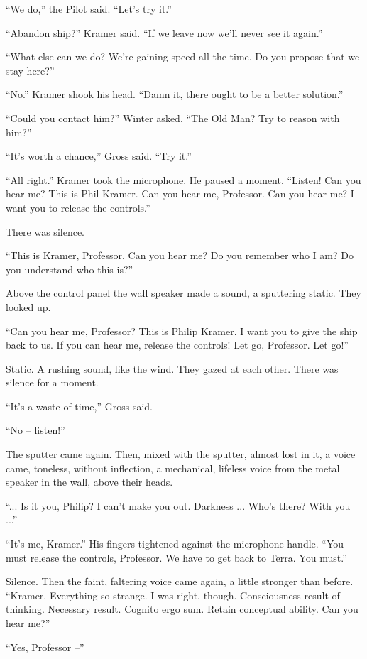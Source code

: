 \documentclass[12pt,a5paper]{book}
\begin{document}
“We do,” the Pilot said. “Let's try it.”

“Abandon ship?” Kramer said. “If we leave now we'll never see it again.”

“What else can we do? We're gaining speed all the time. Do you propose that we stay here?”

“No.” Kramer shook his head. “Damn it, there ought to be a better solution.”

“Could you contact him?” Winter asked. “The Old Man? Try to reason with him?”

“It's worth a chance,” Gross said. “Try it.”

“All right.” Kramer took the microphone. He paused a moment. “Listen! Can you hear me? This is Phil Kramer. Can you hear me, Professor. Can you hear me? I want you to release the controls.”

There was silence.

“This is Kramer, Professor. Can you hear me? Do you remember who I am? Do you understand who this is?”

Above the control panel the wall speaker made a sound, a sputtering static. They looked up.

“Can you hear me, Professor? This is Philip Kramer. I want you to give the ship back to us. If you can hear me, release the controls! Let go, Professor. Let go!”

Static. A rushing sound, like the wind. They gazed at each other. There was silence for a moment.

“It's a waste of time,” Gross said.

“No – listen!”

The sputter came again. Then, mixed with the sputter, almost lost in it, a voice came, toneless, without inflection, a mechanical, lifeless voice from the metal speaker in the wall, above their heads.

“... Is it you, Philip? I can't make you out. Darkness ... Who's there? With you ...”

“It's me, Kramer.” His fingers tightened against the microphone handle. “You must release the controls, Professor. We have to get back to Terra. You must.”

Silence. Then the faint, faltering voice came again, a little stronger than before. “Kramer. Everything so strange. I was right, though. Consciousness result of thinking. Necessary result. Cognito ergo sum. Retain conceptual ability. Can you hear me?”

“Yes, Professor –”
\end{document}
